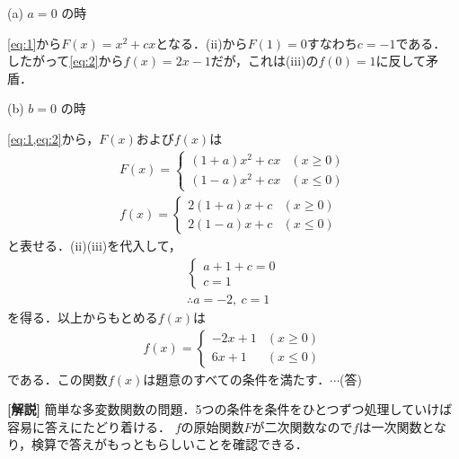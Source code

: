 \documentclass[a4paper,10pt]{ltjsarticle}
\begin{document}
\begin{multicols}{2}
\vspace{1em} %
(a) $a=0$ の時

\cref{eq:1}から$F(x)=x^2 + cx$となる．(ii)から$F(1)=0$すなわち$c=-1$である．
したがって\cref{eq:2}から$f(x)=2x-1$だが，これは(iii)の$f(0)=1$に反して矛盾．

\vspace{1em} %
(b) $b=0$ の時

\cref{eq:1,eq:2}から，$F(x)$および$f(x)$は
\begin{align*}
F(x) = \begin{cases}
    (1+a)x^2 + cx & (x \ge 0) \\
    (1-a)x^2 + cx & (x \le 0)
    \end{cases} \\
f(x) = \begin{cases}
    2(1+a)x + c & (x \ge 0) \\
    2(1-a)x + c & (x \le 0)
    \end{cases}
\end{align*}
と表せる．(ii)(iii)を代入して，
\begin{align*}
    \begin{cases}
    a+1+c = 0 \\
    c=1
    \end{cases} \\
    \therefore a = -2, \ c=1
\end{align*}
を得る．以上からもとめる$f(x)$は
\begin{align*}
f(x) = \begin{cases}
-2x+1 & (x \ge 0) \\
6x+1 & (x \le 0)
\end{cases}
\end{align*}
である．この関数$f(x)$は題意のすべての条件を満たす．$\cdots$(答)

{\bf[解説]}
簡単な多変数関数の問題．5つの条件を条件をひとつずつ処理していけば容易に答えにたどり着ける．
$f$の原始関数$F$が二次関数なので$f$は一次関数となり，検算で答えがもっともらしいことを確認できる．

     \newpage
\end{multicols}
\end{document}
